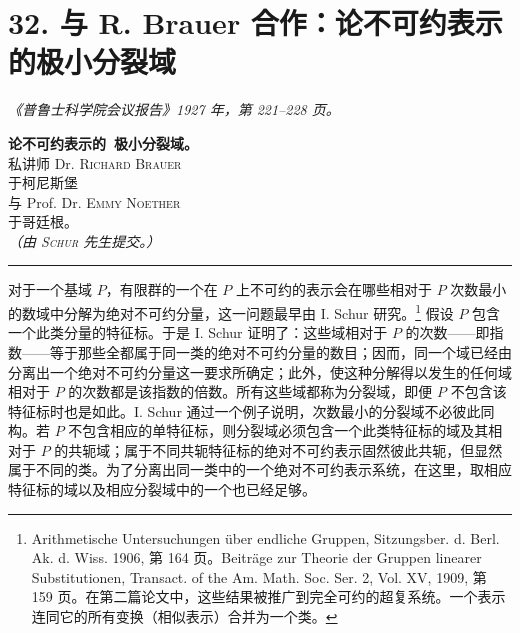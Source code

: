 \section*{32. 与 R. Brauer 合作：论不可约表示的极小分裂域}
\emph{《普鲁士科学院会议报告》1927 年，第 221--228 页。}

\begin{center}
{\Large\bfseries 论不可约表示的\
极小分裂域。}\\[1.0em]
私讲师 Dr. \textsc{Richard Brauer}\\
于柯尼斯堡\\
与 Prof. Dr. \textsc{Emmy Noether}\\
于哥廷根。\\[0.8em]
\emph{（由 \textsc{Schur} 先生提交。）}\\[0.5em]
\rule{4em}{0.4pt}
\end{center}

对于一个基域 $P$，有限群的一个在 $P$ 上不可约的表示会在哪些相对于 $P$ 次数最小的数域中分解为绝对不可约分量，这一问题最早由 I. Schur 研究。\footnote{Arithmetische Untersuchungen über endliche Gruppen, Sitzungsber. d. Berl. Ak. d. Wiss. 1906, 第 164 页。Beiträge zur Theorie der Gruppen linearer Substitutionen, Transact. of the Am. Math. Soc. Ser. 2, Vol. XV, 1909, 第 159 页。在第二篇论文中，这些结果被推广到完全可约的超复系统。一个表示连同它的所有变换（相似表示）合并为一个类。} 假设 $P$ 包含一个此类分量的特征标。于是 I. Schur 证明了：这些域相对于 $P$ 的次数——即指数——等于那些全都属于同一类的绝对不可约分量的数目；因而，同一个域已经由分离出一个绝对不可约分量这一要求所确定；此外，使这种分解得以发生的任何域相对于 $P$ 的次数都是该指数的倍数。所有这些域都称为分裂域，即便 $P$ 不包含该特征标时也是如此。I. Schur 通过一个例子说明，次数最小的分裂域不必彼此同构。若 $P$ 不包含相应的单特征标，则分裂域必须包含一个此类特征标的域及其相对于 $P$ 的共轭域；属于不同共轭特征标的绝对不可约表示固然彼此共轭，但显然属于不同的类。为了分离出同一类中的一个绝对不可约表示系统，在这里，取相应特征标的域以及相应分裂域中的一个也已经足够。

